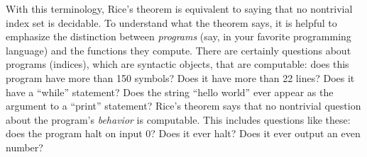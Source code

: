 \documentclass[10pt,a4paper]{article}
\theoremstyle{plain}
\theoremstyle{definition}
\theoremstyle{remark}
\newenvironment{explain}{}{}
\begin{document}
\begin{explain}
With this terminology, Rice's theorem is equivalent to saying that no
nontrivial index set is decidable. To understand what the theorem
says, it is helpful to emphasize the distinction between
\emph{programs} (say, in your favorite programming language) and the
functions they compute. There are certainly questions about programs
(indices), which are syntactic objects, that are computable: does this
program have more than 150 symbols? Does it have more than 22 lines?
Does it have a ``while'' statement? Does the string ``hello world''
ever appear as the argument to a ``print'' statement? Rice's theorem
says that no nontrivial question about the program's \emph{behavior}
is computable. This includes questions like these: does the program
halt on input $0$? Does it ever halt? Does it ever output an even
number?
\end{explain}
\end{document}
